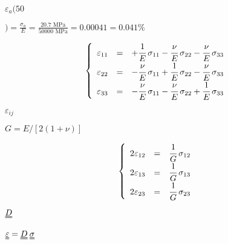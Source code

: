 \documentclass[onecolumn,11pt]{report}
\def\lthtmlcheckvsize{\ifdim\ht\sizebox<\vsize 
  \ifdim\wd\sizebox<\hsize\expandafter\hfill\fi \expandafter\vfill
  \else\expandafter\vss\fi}%
\begin{document}
{\newpage\clearpage
{}%
$\displaystyle \varepsilon_a(50$%
\lthtmlindisplaymathZ
\lthtmlcheckvsize\clearpage}

{\newpage\clearpage
{}%
$\displaystyle ) = \frac{\sigma_a}{E} = \frac{20.7 \text{ MPa}}{50000 \text{ MPa}} = 0.00041 = 0.041 \%
$%
\lthtmlindisplaymathZ
\lthtmlcheckvsize\clearpage}

{\newpage\clearpage
{}%
\begin{displaymath}\left\lbrace
\begin{array}{rcl}
\varepsilon_{11} & = & +\cfrac{1}{E} \: \sigma_{11} -\cfrac{\nu}{E} \: \sigma_{22} -\cfrac{\nu}{E} \: \sigma_{33}\\
\varepsilon_{22} & = &  -\cfrac{\nu}{E} \: \sigma_{11} +\cfrac{1}{E} \: \sigma_{22} - \cfrac{\nu}{E} \: \sigma_{33}\\
\varepsilon_{33} & = & -\cfrac{\nu}{E} \: \sigma_{11} -\cfrac{\nu}{E} \: \sigma_{22} + \cfrac{1}{E} \: \sigma_{33}
\end{array}
\right.\end{displaymath}%
\lthtmldisplayZ
\lthtmlcheckvsize\clearpage}

{\newpage\clearpage
{}%
$ \varepsilon_{ij}$%
\lthtmlindisplaymathZ
\lthtmlcheckvsize\clearpage}

{\newpage\clearpage
{}%
$ G=E/[2(1+\nu)]$%
\lthtmlindisplaymathZ
\lthtmlcheckvsize\clearpage}

{\newpage\clearpage
{}%
\begin{displaymath}\left\lbrace
\begin{array}{rcl}
2 \varepsilon_{12} & = & \cfrac{1}{G} \: \sigma_{12}\\
2 \varepsilon_{13} & = & \cfrac{1}{G} \: \sigma_{13}\\
2 \varepsilon_{23} & = & \cfrac{1}{G} \: \sigma_{23}
\end{array}
\right.\end{displaymath}%
\lthtmldisplayZ
\lthtmlcheckvsize\clearpage}

{\newpage\clearpage
{}%
$ \uuline{D}$%
\lthtmlindisplaymathZ
\lthtmlcheckvsize\clearpage}

{\newpage\clearpage
{}%
$\displaystyle \uuline{\varepsilon} = \uuline{D} \: \uuline{\sigma}$%
\lthtmlindisplaymathZ
\lthtmlcheckvsize\clearpage}
\end{document}
